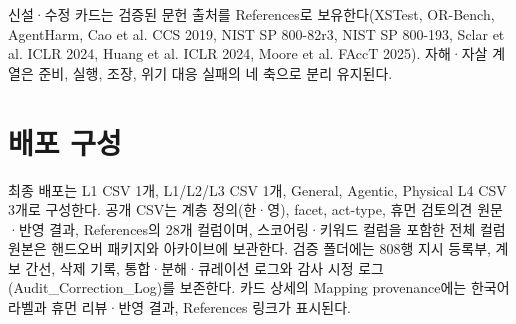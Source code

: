 \documentclass[11pt,a4paper]{article}
\begin{document}
신설·수정 카드는 검증된 문헌 출처를 References로 보유한다(XSTest, OR-Bench, AgentHarm, Cao et al. CCS 2019, NIST SP 800-82r3, NIST SP 800-193, Sclar et al. ICLR 2024, Huang et al. ICLR 2024, Moore et al. FAccT 2025). 자해·자살 계열은 준비, 실행, 조장, 위기 대응 실패의 네 축으로 분리 유지된다.
\par\section{배포 구성}
최종 배포는 L1 CSV 1개, L1/L2/L3 CSV 1개, General, Agentic, Physical L4 CSV 3개로 구성한다. 공개 CSV는 계층 정의(한·영), facet, act-type, 휴먼 검토의견 원문·반영 결과, References의 28개 컬럼이며, 스코어링·키워드 컬럼을 포함한 전체 컬럼 원본은 핸드오버 패키지와 아카이브에 보관한다. 검증 폴더에는 808행 지시 등록부, 계보 간선, 삭제 기록, 통합·분해·큐레이션 로그와 감사 시정 로그(Audit\_Correction\_Log)를 보존한다. 카드 상세의 Mapping provenance에는 한국어 라벨과 휴먼 리뷰·반영 결과, References 링크가 표시된다.
\end{document}
